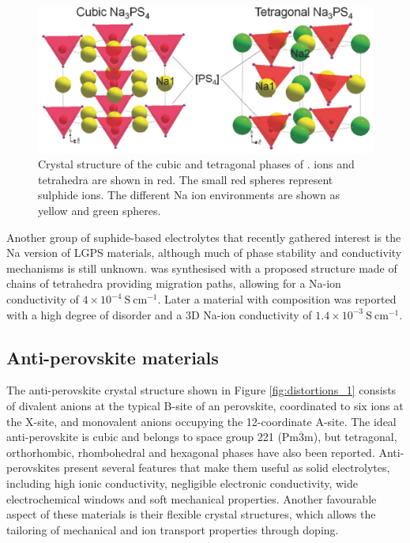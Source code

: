 \documentclass[12pt]{report}
\begin{document}
\begin{figure}[!ht]
\centering
\includegraphics[width=12cm]{./figures/ngps.jpg}
\caption{Crystal structure of the cubic and tetragonal phases of .  ions and  tetrahedra are shown in red. The small red spheres represent sulphide ions. The different Na ion environments are shown as yellow and green spheres.\cite{zhao2018}}
\label{ngps}
\end{figure}

Another group of suphide-based electrolytes that recently gathered interest is the Na version of LGPS materials, although much of phase stability and conductivity mechanisms is
still unknown.\cite{kandagal2015}
 was synthesised with a proposed structure made of chains of  tetrahedra  providing migration paths, allowing for a Na-ion conductivity of $4 \times 10^{-4} \ \mathrm{S \ cm^{-1}}$.\cite{richards2016}
Later a material with composition  was reported with a high degree of disorder and a 3D Na-ion conductivity of $1.4 \times 10^{-3} \ \mathrm{S \ cm^{-1}}$.\cite{zhang2018c}

\subsection{Anti-perovskite materials}

The anti-perovskite crystal structure shown in Figure \ref{fig:distortions_1} consists of divalent anions at the typical B-site of an  perovskite, coordinated to six  ions at the X-site, and monovalent anions occupying the 12-coordinate A-site.
The ideal anti-perovskite is cubic and belongs to space group 221 (Pm$\overline{3}$m), but tetragonal, orthorhombic, rhombohedral and hexagonal phases have also been reported.\cite{megaw1946, bhalla2000}
Anti-perovskites present several features that make them useful as solid electrolytes, including high ionic conductivity, negligible electronic conductivity, wide electrochemical windows and soft mechanical properties. 
Another favourable aspect of these materials is their flexible crystal structures, which allows the tailoring of mechanical and ion transport properties through doping.\cite{dawson2021, wang2020b}
\end{document}
